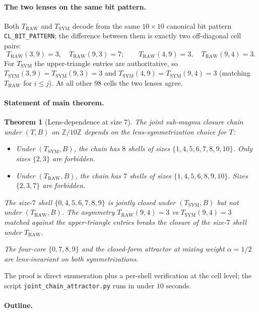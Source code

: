\documentclass[11pt,reqno]{amsart}
\newtheorem{theorem}{Theorem}[section]
\theoremstyle{definition}
\newcommand{\Z}{\mathbb{Z}}
\newcommand{\TRAW}{T_{\mathrm{RAW}}}
\newcommand{\TSYM}{T_{\mathrm{SYM}}}
\newcommand{\TSML}{T}
\newcommand{\BHML}{B}
\begin{document}
\paragraph{The two lenses on the same bit pattern.}

Both $\TRAW$ and $\TSYM$ decode from the same $10 \times 10$
canonical bit pattern \texttt{CL\_BIT\_PATTERN}; the difference
between them is exactly two off-diagonal cell pairs:
\[
  \TRAW(3, 9) = 3, \quad \TRAW(9, 3) = 7;\qquad
  \TRAW(4, 9) = 3, \quad \TRAW(9, 4) = 3.
\]
For $\TSYM$ the upper-triangle entries are authoritative, so
$\TSYM(3, 9) = \TSYM(9, 3) = 3$ and
$\TSYM(4, 9) = \TSYM(9, 4) = 3$ (matching $\TRAW$ for $i \leq j$).
At all other $98$ cells the two lenses agree.

\paragraph{Statement of main theorem.}

\begin{theorem}[Lens-dependence at size $7$]
\label{thm:main}
The joint sub-magma closure chain under $(\TSML, \BHML)$ on
$\Z/10\Z$ depends on the lens-symmetrization choice for $\TSML$:
\begin{itemize}[leftmargin=*]
\item Under $(\TSYM, \BHML)$, the chain has $8$ shells of sizes
  $\{1, 4, 5, 6, 7, 8, 9, 10\}$. Only sizes $\{2, 3\}$ are
  forbidden.
\item Under $(\TRAW, \BHML)$, the chain has $7$ shells of sizes
  $\{1, 4, 5, 6, 8, 9, 10\}$. Sizes $\{2, 3, 7\}$ are forbidden.
\end{itemize}
The size-$7$ shell $\{0, 4, 5, 6, 7, 8, 9\}$ is jointly closed
under $(\TSYM, \BHML)$ but not under $(\TRAW, \BHML)$. The
asymmetry $\TRAW(9, 4) = 3$ vs $\TSYM(9, 4) = 3$ matched against
the upper-triangle entries breaks the closure of the size-$7$ shell
under $\TRAW$.

The four-core $\{0, 7, 8, 9\}$ and the closed-form attractor at
mixing weight $\alpha = 1/2$ are lens-invariant on both
symmetrizations.
\end{theorem}

The proof is direct enumeration plus a per-shell verification at
the cell level; the script
\texttt{joint\_chain\_attractor.py}
\cite{Gen13WP115} runs in under $10$ seconds.

\paragraph{Outline.}
\end{document}
